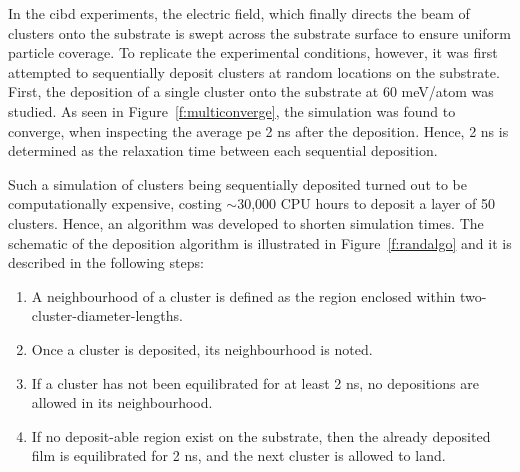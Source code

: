 In the \gls{cibd} experiments, the electric field, which finally directs the beam of clusters onto the substrate is swept across the substrate surface to ensure uniform particle coverage. To replicate the experimental conditions, however, it was first attempted to sequentially deposit clusters at random locations on the substrate. First, the deposition of a single cluster onto the substrate at 60 meV/atom was studied. As seen in Figure~\ref{f:multiconverge}, the simulation was found to converge, when inspecting the average \gls{pe} 2 ns after the deposition. Hence, 2 ns is determined as the relaxation time between each sequential deposition. \par Such a simulation of clusters being sequentially deposited turned out to be computationally expensive, costing $\sim$30,000 CPU hours to deposit a layer of 50 clusters. Hence, an algorithm was developed to shorten simulation times. The schematic of the deposition algorithm is illustrated in Figure~\ref{f:randalgo} and it is described in the following steps:

\begin{enumerate}[noitemsep]
	\item A neighbourhood of a cluster is defined as the region enclosed within two-cluster-diameter-lengths.
	\item Once a cluster is deposited, its neighbourhood is noted.
	\item If a cluster has not been equilibrated for at least 2 ns, no depositions are allowed in its neighbourhood.
	\item If no deposit-able region exist on the substrate, then the already deposited film is equilibrated for 2 ns, and the next cluster is allowed to land.
\end{enumerate}

